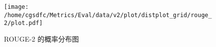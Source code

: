 \begin{figure}[H]%
\centering%
\texttt{[image: /home/cgsdfc/Metrics/Eval/data/v2/plot/distplot\_grid/rouge\_2/plot.pdf]}%
\caption{ROUGE{-}2 的概率分布图}%
\label{fig:ROUGE{-}2dist}%
\end{figure}